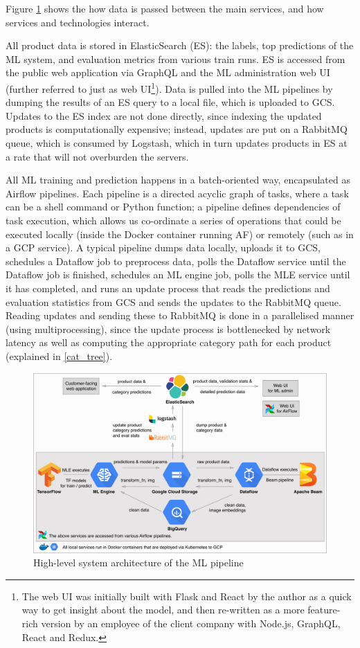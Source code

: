 Figure \ref{arch_diagram} shows the how data is passed between the main services, and how services and technologies interact.

All product data is stored in ElasticSearch (ES): the labels, top predictions of the ML system, and evaluation metrics from various train runs.
ES is accessed from the public web application via GraphQL and the ML administration web UI (further referred to just as web UI\footnote{The web UI was initially built with Flask and React by the author as a quick way to get insight about the model, and then re-written as a more feature-rich version by an employee of the client company with Node.js, GraphQL, React and Redux.}).
Data is pulled into the ML pipelines by dumping the results of an ES query to a local file, which is uploaded to GCS.
Updates to the ES index are not done directly, since indexing the updated products is computationally expensive; instead, updates are put on a RabbitMQ queue, which is consumed by Logstash, which in turn updates products in ES at a rate that will not overburden the servers.

All ML training and prediction happens in a batch-oriented way, encapsulated as Airflow pipelines.
Each pipeline is a directed acyclic graph of tasks, where a task can be a shell command or Python function; a pipeline defines dependencies of task execution, which allows us co-ordinate a series of operations that could be executed locally (inside the Docker container running AF) or remotely (such as in a GCP service).
A typical pipeline dumps data locally, uploads it to GCS, schedules a Dataflow job to preprocess data, polls the Dataflow service until the Dataflow job is finished, schedules an ML engine job, polls the MLE service until it has completed, and runs an update process that reads the predictions and evaluation statistics from GCS and sends the updates to the RabbitMQ queue.
Reading updates and sending these to RabbitMQ is done in a parallelised manner (using multiprocessing), since the update process is bottlenecked by network latency as well as computing the appropriate category path for each product (explained in \ref{cat_tree}).

\begin{figure}
  \hspace*{-0.2\textwidth}
  \includegraphics[width=1.4\textwidth]{diagrams/architecture}
  \caption{High-level system architecture of the ML pipeline}
  \label{arch_diagram}
\end{figure}

